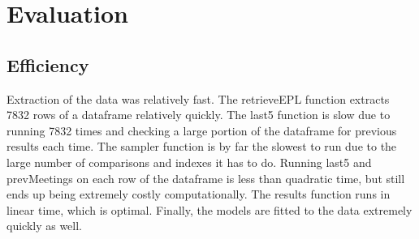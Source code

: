 \documentclass[sigconf]{acmart}
\begin{document}
\section{Evaluation}
\subsection{Efficiency}
Extraction of the data was relatively fast. The retrieveEPL function extracts 7832 rows of a dataframe relatively quickly. The last5 function is slow due to running 7832 times and checking a large portion of the dataframe for previous results each time. The sampler function is by far the slowest to run due to the large number of comparisons and indexes it has to do. Running last5 and prevMeetings on each row of the dataframe is less than quadratic time, but still ends up being extremely costly computationally. The results function runs in linear time, which is optimal. Finally, the models are fitted to the data extremely quickly as well.
\end{document}
